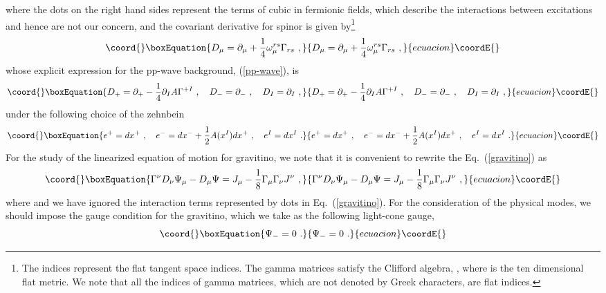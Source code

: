 \documentclass[a4paper,12pt]{article}
\numberwithin{equation}{section}
\begin{document}
where the dots on the right hand sides represent the terms of cubic in
fermionic fields, which describe the interactions between excitations
and hence are not our concern, and the covariant derivative for spinor
is given by\footnote{The indices \coordHE{} represent the flat tangent
  space indices.  The gamma matrices \coordHE{} satisfy the \coordHE{}
  Clifford algebra, \coordHE{}, where
  \coordHE{} is the ten dimensional flat metric. We note that all the
  indices of gamma matrices, which are not denoted by Greek
  characters, are flat indices.}
\begin{equation}\coord{}\boxEquation{
D_\mu = \partial_\mu + \frac{1}{4} \omega_\mu^{rs} \Gamma_{rs} ~,
}{
D_\mu = \partial_\mu + \frac{1}{4} \omega_\mu^{rs} \Gamma_{rs} ~,
}{ecuacion}\coordE{}\end{equation}
whose explicit expression for the pp-wave background, (\ref{pp-wave}),
is
\begin{equation}\coord{}\boxEquation{
D_+ = \partial_+ - \frac{1}{4} \partial_I A \Gamma^{+I} ~,~~~
D_- = \partial_- ~,~~~
D_I = \partial_I ~,
}{
D_+ = \partial_+ - \frac{1}{4} \partial_I A \Gamma^{+I} ~,~~~
D_- = \partial_- ~,~~~
D_I = \partial_I ~,
}{ecuacion}\coordE{}\end{equation}
under the following choice of the zehnbein
\begin{equation}\coord{}\boxEquation{
e^+ = dx^+ ~,~~~
e^- = dx^- + \frac{1}{2} A(x^I) dx^+ ~,~~~
e^I = dx^I ~.
\label{pp}
}{
e^+ = dx^+ ~,~~~
e^- = dx^- + \frac{1}{2} A(x^I) dx^+ ~,~~~
e^I = dx^I ~.
}{ecuacion}\coordE{}\end{equation}
For the study of the linearized equation of motion for gravitino, we
note that it is convenient to rewrite the Eq.~(\ref{gravitino}) as
\begin{equation}\coord{}\boxEquation{
\Gamma^\nu  D_\nu \Psi_\mu - D_\mu \Psi
 = J_\mu - \frac{1}{8} \Gamma_\mu \Gamma_\nu J^\nu ~,
\label{s3/2}
}{
\Gamma^\nu  D_\nu \Psi_\mu - D_\mu \Psi
 = J_\mu - \frac{1}{8} \Gamma_\mu \Gamma_\nu J^\nu ~,
}{ecuacion}\coordE{}\end{equation}
where \myHighlight{$\Psi \equiv \Gamma^\mu \Psi_\mu$}\coordHE{} and we have ignored the
interaction terms represented by dots in Eq.~(\ref{gravitino}).  For
the consideration of the physical modes, we should impose the gauge
condition for the gravitino, which we take as the following light-cone
gauge,
\begin{equation}\coord{}\boxEquation{
\Psi_- = 0 ~.
\label{f-gauge}
}{
\Psi_- = 0 ~.
}{ecuacion}\coordE{}\end{equation}
\end{document}
